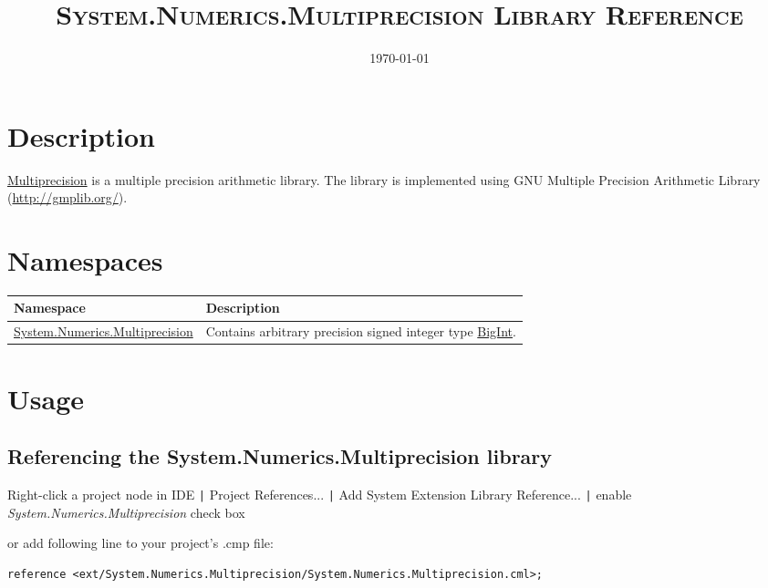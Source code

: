 \documentclass[a4paper,oneside,11.000000pt]{book}
\begin{document}
\clearpage

\frontmatter
\title{\textsc{System.Numerics.Multiprecision Library Reference}
}
\date{\today}
\maketitle
\tableofcontents

\clearpage
\chapter{Description}
\begin{flushleft}
\hyperlink{System.Numerics.Multiprecision}{Multiprecision} is a multiple precision arithmetic library.
The library is implemented using GNU Multiple Precision Arithmetic Library 
(\url{http://gmplib.org/}).

\end{flushleft}
\chapter{Namespaces}
\begin{flushleft}
\begin{supertabular}[l]{!{\raggedright}p{7.44777cm}!{\raggedright}p{7.70223cm}}
\textbf{Namespace}
& \textbf{Description}
\\
\hline
\hyperlink{System.Numerics.Multiprecision}{System.Numerics.Multiprecision}
& Contains arbitrary precision signed integer type \hyperlink{System.Numerics.Multiprecision.BigInt}{BigInt}.

\\
\end{supertabular}

\end{flushleft}
\clearpage
\mainmatter

\chapter{Usage}

\section{Referencing the System.Numerics.Multiprecision library}

Right-click a project node in IDE \verb.|. Project References... \verb.|.
Add System Extension Library Reference... \verb.|.
enable \emph{System.Numerics.Multiprecision} check box

\begin{flushleft}
or add following line to your project's .cmp file:
\begin{verbatim}
reference <ext/System.Numerics.Multiprecision/System.Numerics.Multiprecision.cml>;
\end{verbatim}
\end{flushleft}
\end{document}
